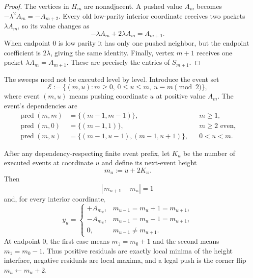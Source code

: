 \begin{proof}
The vertices in $H_m$ are nonadjacent. A pushed value $A_m$ becomes
$-\lambda^2A_m=-A_{m+2}$. Every old low-parity interior coordinate receives
two packets $\lambda A_m$, so its value changes as
\begin{equation*}
 -\lambda A_m+2\lambda A_m=A_{m+1}.
\end{equation*}
When endpoint $0$ is low parity it has only one pushed neighbor, but the
endpoint coefficient is $2\lambda$, giving the same identity. Finally,
vertex $m+1$ receives one packet $\lambda A_m=A_{m+1}$. These are precisely
the entries of $S_{m+1}$.
\end{proof}

The sweeps need not be executed level by level. Introduce the event set
\begin{equation}
 \mathcal E:=\{(m,u):m\geq0,\ 0\leq u\leq m,\ u\equiv m\pmod2\},
 \label{eq:direct-path-events}
\end{equation}
where event $(m,u)$ means pushing coordinate $u$ at positive value $A_m$.
The event's dependencies are
\begin{equation}
\begin{aligned}
 \operatorname{pred}(m,m)&=\{(m-1,m-1)\},
 &&m\geq1,\\
 \operatorname{pred}(m,0)&=\{(m-1,1)\},
 &&m\geq2\text{ even},\\
 \operatorname{pred}(m,u)&=\{(m-1,u-1),(m-1,u+1)\},
 &&0<u<m.
\end{aligned}
\label{eq:direct-path-predecessors}
\end{equation}

\begin{lemma}
\label{lem:direct-path-corner-flip}
After any dependency-respecting finite event prefix, let $K_u$ be the number
of executed events at coordinate $u$ and define its next-event height
\begin{equation}
 m_u:=u+2K_u.
 \label{eq:direct-path-height}
\end{equation}
Then
\begin{equation}
 |m_{u+1}-m_u|=1
 \label{eq:direct-path-one-lipschitz}
\end{equation}
and, for every interior coordinate,
\begin{equation}
 y_u=\begin{cases}
  +A_{m_u},&m_{u-1}=m_u+1=m_{u+1},\\
  -A_{m_u},&m_{u-1}=m_u-1=m_{u+1},\\
  0,&m_{u-1}\neq m_{u+1}.
 \end{cases}
 \label{eq:direct-path-corner-residual}
\end{equation}
At endpoint $0$, the first case means $m_1=m_0+1$ and the second means
$m_1=m_0-1$. Thus positive residuals are exactly local minima of the height
interface, negative residuals are local maxima, and a legal push is the
corner flip $m_u\leftarrow m_u+2$.
\end{lemma}

